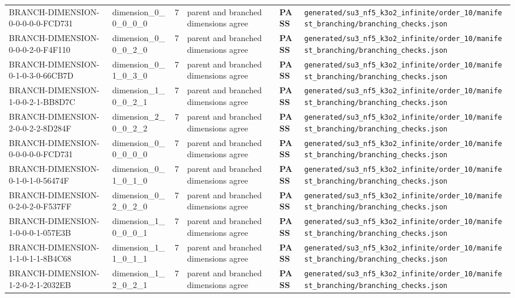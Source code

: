 \documentclass[11pt]{article}
\newcommand{\Pass}{\textcolor{green!50!black}{\textbf{PASS}}}
\newcommand{\RawPath}[1]{\texttt{#1}}
\begin{document}
\begin{longtable}{p{3cm}p{2.5cm}r p{3cm}l p{2cm}}
BRANCH-DIMENSION-0-0-0-0-0-FCD731 & dimension\_0\_0\_0\_0\_0 & 7 & parent and branched dimensions agree & \Pass & \RawPath{generated/su3\_nf5\_k3o2\_infinite/order\_10/manifest\_branching/branching\_checks.json}\\
BRANCH-DIMENSION-0-0-0-2-0-F4F110 & dimension\_0\_0\_0\_2\_0 & 7 & parent and branched dimensions agree & \Pass & \RawPath{generated/su3\_nf5\_k3o2\_infinite/order\_10/manifest\_branching/branching\_checks.json}\\
BRANCH-DIMENSION-0-1-0-3-0-66CB7D & dimension\_0\_1\_0\_3\_0 & 7 & parent and branched dimensions agree & \Pass & \RawPath{generated/su3\_nf5\_k3o2\_infinite/order\_10/manifest\_branching/branching\_checks.json}\\
BRANCH-DIMENSION-1-0-0-2-1-BB8D7C & dimension\_1\_0\_0\_2\_1 & 7 & parent and branched dimensions agree & \Pass & \RawPath{generated/su3\_nf5\_k3o2\_infinite/order\_10/manifest\_branching/branching\_checks.json}\\
BRANCH-DIMENSION-2-0-0-2-2-8D284F & dimension\_2\_0\_0\_2\_2 & 7 & parent and branched dimensions agree & \Pass & \RawPath{generated/su3\_nf5\_k3o2\_infinite/order\_10/manifest\_branching/branching\_checks.json}\\
BRANCH-DIMENSION-0-0-0-0-0-FCD731 & dimension\_0\_0\_0\_0\_0 & 7 & parent and branched dimensions agree & \Pass & \RawPath{generated/su3\_nf5\_k3o2\_infinite/order\_10/manifest\_branching/branching\_checks.json}\\
BRANCH-DIMENSION-0-1-0-1-0-56474F & dimension\_0\_1\_0\_1\_0 & 7 & parent and branched dimensions agree & \Pass & \RawPath{generated/su3\_nf5\_k3o2\_infinite/order\_10/manifest\_branching/branching\_checks.json}\\
BRANCH-DIMENSION-0-2-0-2-0-F537FF & dimension\_0\_2\_0\_2\_0 & 7 & parent and branched dimensions agree & \Pass & \RawPath{generated/su3\_nf5\_k3o2\_infinite/order\_10/manifest\_branching/branching\_checks.json}\\
BRANCH-DIMENSION-1-0-0-0-1-057E3B & dimension\_1\_0\_0\_0\_1 & 7 & parent and branched dimensions agree & \Pass & \RawPath{generated/su3\_nf5\_k3o2\_infinite/order\_10/manifest\_branching/branching\_checks.json}\\
BRANCH-DIMENSION-1-1-0-1-1-8B4C68 & dimension\_1\_1\_0\_1\_1 & 7 & parent and branched dimensions agree & \Pass & \RawPath{generated/su3\_nf5\_k3o2\_infinite/order\_10/manifest\_branching/branching\_checks.json}\\
BRANCH-DIMENSION-1-2-0-2-1-2032EB & dimension\_1\_2\_0\_2\_1 & 7 & parent and branched dimensions agree & \Pass & \RawPath{generated/su3\_nf5\_k3o2\_infinite/order\_10/manifest\_branching/branching\_checks.json}\\

\end{longtable}
\end{document}
